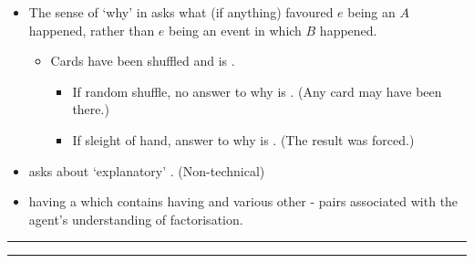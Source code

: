 \documentclass[10pt]{article}
\newcommand\sepLine{
  \vfill
  \par\noindent\rule{\textwidth}{0.4pt}%
  \vspace{-10pt}%
  \par\noindent\rule{\textwidth}{0.4pt}
  \vfill}
\newcommand{\hand}{\ding{43}}
\begin{document}
\begin{note}
  \begin{itemize}
  \item
    The sense of `why' in \qWhy{} asks what (if anything) favoured \(e\) being an \eiw{} \(A\) happened, rather than \(e\) being an event in which \(B\) happened.
    \begin{itemize}
    \item
      Cards have been shuffled and \mainCard{} is \mainCardPos{}.
      \begin{itemize}
      \item
        If random shuffle, no answer to why \mainCard{} is \mainCardPos{}. \hfill (Any card may have been there.)
      \item
        If sleight of hand, answer to why \mainCard{} is \mainCardPos{}. \hfill (The result was forced.)
      \end{itemize}
    \end{itemize}
  \end{itemize}

  \begin{itemize}
  \item[\hand]
    \qWhy{} asks about `explanatory' . \hfill (Non-technical)
  \item
    \propM{\rootsCon{}} having \val{}  \fof{} a \pool{} which contains \propM{\rootsConEq{}} having \val{}  and various other - pairs associated with the agent's understanding of factorisation.
  \end{itemize}
\end{note}

\begin{comment}
  Note, \qWhy{} asks about \emph{partial} explanations.
  So, these explanations need not be sufficient.
  And, \qWhy{} does not require the (partial) explanations are necessary.

  In this respect, you're allowed to lose some interest here.
  And, I think the permissiveness of explanation here is potentially an issue.
  That being said, I think some work could be done to add some interesting constraints here.
  The issue is incorporating these constraints into arguments.
  On the one hand, there's an issue of whether the relevant arguments can be made.
  And, on the other hand, there's an issue of complexity.
\end{comment}

\sepLine
\end{document}
